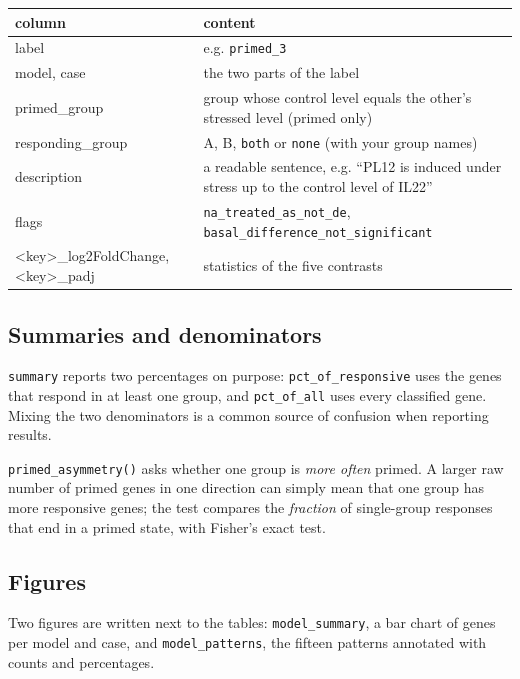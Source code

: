 \documentclass[11pt,a4paper]{article}
\newcommand{\code}[1]{\texttt{\color{navy!85!black}#1}}
\begin{document}
\begin{center}
\small
\begin{tabularx}{\linewidth}{>{\ttfamily\color{navy!85!black}}l Y}
\toprule
\textsf{\textbf{column}} & \textsf{\textbf{content}}\\
\midrule
label & e.g. \code{primed\_3}\\
model, case & the two parts of the label\\
primed\_group & group whose control level equals the other's stressed level (primed only)\\
responding\_group & A, B, \code{both} or \code{none} (with your group names)\\
description & a readable sentence, e.g. ``PL12 is induced under stress up to the control level of IL22''\\
flags & \code{na\_treated\_as\_not\_de}, \code{basal\_difference\_not\_significant}\\
<key>\_log2FoldChange, <key>\_padj & statistics of the five contrasts\\
\bottomrule
\end{tabularx}
\end{center}

\subsection{Summaries and denominators}

\code{summary} reports two percentages on purpose: \code{pct\_of\_responsive} uses the genes that respond
in at least one group, and \code{pct\_of\_all} uses every classified gene. Mixing the two denominators is
a common source of confusion when reporting results.

\code{primed\_asymmetry()} asks whether one group is \emph{more often} primed. A larger raw number of
primed genes in one direction can simply mean that one group has more responsive genes; the test
compares the \emph{fraction} of single-group responses that end in a primed state, with Fisher's
exact test.

\subsection{Figures}

Two figures are written next to the tables: \code{model\_summary}, a bar chart of genes per model
and case, and \code{model\_patterns}, the fifteen patterns annotated with counts and percentages.
\end{document}
